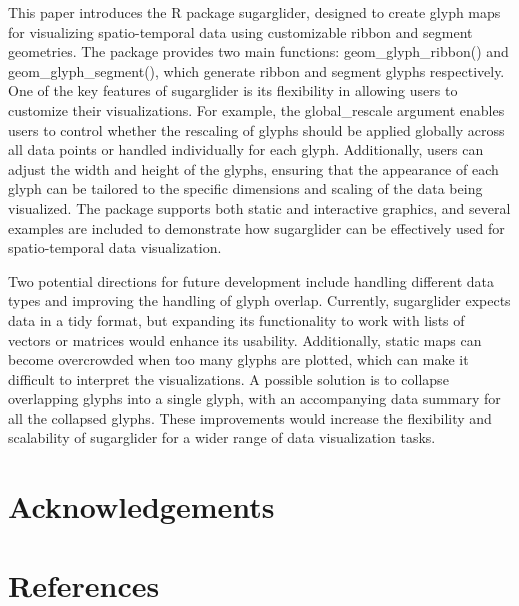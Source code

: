 This paper introduces the R package sugarglider, designed to create glyph maps for visualizing spatio-temporal data using customizable ribbon and segment geometries. The package provides two main functions: geom\_glyph\_ribbon() and geom\_glyph\_segment(), which generate ribbon and segment glyphs respectively. One of the key features of sugarglider is its flexibility in allowing users to customize their visualizations. For example, the global\_rescale argument enables users to control whether the rescaling of glyphs should be applied globally across all data points or handled individually for each glyph. Additionally, users can adjust the width and height of the glyphs, ensuring that the appearance of each glyph can be tailored to the specific dimensions and scaling of the data being visualized. The package supports both static and interactive graphics, and several examples are included to demonstrate how sugarglider can be effectively used for spatio-temporal data visualization.

Two potential directions for future development include handling different data types and improving the handling of glyph overlap. Currently, sugarglider expects data in a tidy format, but expanding its functionality to work with lists of vectors or matrices would enhance its usability. Additionally, static maps can become overcrowded when too many glyphs are plotted, which can make it difficult to interpret the visualizations. A possible solution is to collapse overlapping glyphs into a single glyph, with an accompanying data summary for all the collapsed glyphs. These improvements would increase the flexibility and scalability of sugarglider for a wider range of data visualization tasks.

\hypertarget{acknowledgements}{%
\section{Acknowledgements}\label{acknowledgements}}

\hypertarget{references}{%
\section*{References}\label{references}}

